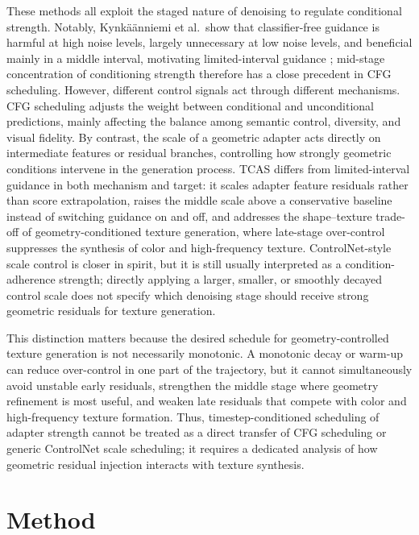 \documentclass[times,twocolumn,final]{elsarticle}
\providecommand{\DIFadd}[1]{{\protect\color{blue} \sf #1}} %
\providecommand{\DIFaddbegin}{} %
\providecommand{\DIFaddend}{} %
\newcommand{\DIFaddincludegraphics}[2][]{{\color{blue}\fbox{\DIFOincludegraphics[#1]{#2}}}} %
\DeclareRobustCommand{\DIFaddbegin}{\DIFOaddbegin \let\includegraphics\DIFaddincludegraphics} %
\DeclareRobustCommand{\DIFaddend}{\DIFOaddend \let\includegraphics\DIFOincludegraphics} %
\begin{document}
These methods all exploit the staged nature of denoising to regulate conditional strength. \DIFaddbegin \DIFadd{Notably, Kynk\"a\"anniemi et al.\ show that classifier-free guidance is harmful at high noise levels, largely unnecessary at low noise levels, and beneficial mainly in a middle interval, motivating limited-interval guidance \cite{kynkanniemi2024limited}; mid-stage concentration of conditioning strength therefore has a close precedent in CFG scheduling. }\DIFaddend However, different control signals act through different mechanisms. CFG scheduling adjusts the weight between conditional and unconditional predictions, mainly affecting the balance among semantic control, diversity, and visual fidelity. By contrast, the scale of a geometric adapter acts directly on intermediate features or residual branches, controlling how strongly geometric conditions intervene in the generation process. \DIFaddbegin \DIFadd{TCAS differs from limited-interval guidance in both mechanism and target: it scales adapter feature residuals rather than score extrapolation, raises the middle scale above a conservative baseline instead of switching guidance on and off, and addresses the shape--texture trade-off of geometry-conditioned texture generation, where late-stage over-control suppresses the synthesis of color and high-frequency texture. }\DIFaddend ControlNet-style scale control is closer in spirit, but it is still usually interpreted as a condition-adherence strength; directly applying a larger, smaller, or smoothly decayed control scale does not specify which denoising stage should receive strong geometric residuals for texture generation.

This distinction matters because the desired schedule for geometry-controlled texture generation is not necessarily monotonic. A monotonic decay or warm-up can reduce over-control in one part of the trajectory, but it cannot simultaneously avoid unstable early residuals, strengthen the middle stage where geometry refinement is most useful, and weaken late residuals that compete with color and high-frequency texture formation. Thus, timestep-conditioned scheduling of adapter strength cannot be treated as a direct transfer of CFG scheduling or generic ControlNet scale scheduling; it requires a dedicated analysis of how geometric residual injection interacts with texture synthesis.

\section{Method}
\label{sec:method}
\end{document}
